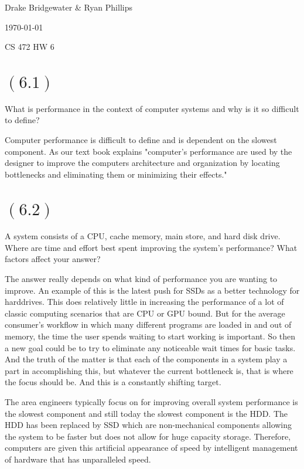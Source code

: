 \documentclass[letterpaper,12pt,titlepage]{article}
\def\name{Drake Bridgewater \& Ryan Phillips}
\begin{document}
\hfill \name

\hfill \today

\hfill CS 472 HW 6

\section*{$(6.1)$} What is performance in the context of computer systems and why is it so difficult to define?

\begin{mdframed}[style=MyFrame]
Computer performance is difficult to define and is dependent on the slowest component. As our text book explains "computer's performance are used by the designer to improve the computers architecture and organization by locating bottlenecks and eliminating them or minimizing their effects." \cite{Clements}
\end{mdframed}

\section*{$(6.2)$} A system consists of a CPU, cache memory, main store, and hard disk drive. Where are time and effort best spent improving the system's performance? What factors affect your answer?

\begin{mdframed}[style=MyFrame]
The answer really depends on what kind of performance you are wanting to improve. An example of this is the latest push for SSDs as a better technology for harddrives. This does relatively little in increasing the performance of a lot of classic computing scenarios that are CPU or GPU bound. But for the average consumer's workflow in which many different programs are loaded in and out of memory, the time the user spends waiting to start working is important. So then a new goal could be to try to eliminate any noticeable wait times for basic tasks. And the truth of the matter is that each of the components in a system play a part in accomplishing this, but whatever the current bottleneck is, that is where the focus should be. And this is a constantly shifting target.

The area engineers typically focus on for improving overall system performance is the slowest component and still today the slowest component is the HDD. The HDD has been replaced by SSD which are non-mechanical components allowing the system to be faster but does not allow for huge capacity storage. Therefore, computers are given this artificial appearance of speed by intelligent management of hardware that has unparalleled speed.
\end{mdframed}
\end{document}
